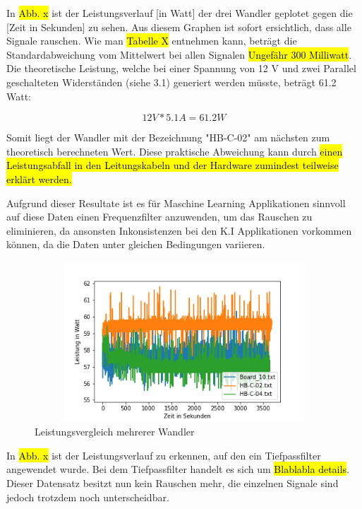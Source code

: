 \begin{flushleft}

In \hl{Abb. x} ist der Leistungsverlauf [in Watt] der drei Wandler geplotet gegen die [Zeit in Sekunden] zu sehen. Aus diesem Graphen ist sofort ersichtlich, dass alle Signale rauschen. Wie man \hl{Tabelle X} entnehmen kann, beträgt die Standardabweichung vom Mittelwert bei allen Signalen \hl{Ungefähr 300 Milliwatt}. Die theoretische Leistung, welche bei einer Spannung von 12 V und zwei Parallel geschalteten Widerständen (siehe 3.1) generiert werden müsste, beträgt 61.2 Watt: 

\begin{equation}[H]
\label{Ohmsches Gesetz}
12 V * 5.1 A = 61.2 W 
\end{equation} 

Somit liegt der Wandler mit der Bezeichnung "HB-C-02" am nächsten zum theoretisch berechneten Wert. Diese praktische Abweichung kann durch \hl{einen Leistungsabfall in den Leitungskabeln und der Hardware zumindest teilweise erklärt werden.}

Aufgrund dieser Resultate ist es für Maschine Learning Applikationen sinnvoll auf diese Daten einen Frequenzfilter anzuwenden, um das Rauschen zu eliminieren, da ansonsten Inkonsistenzen bei den K.I Applikationen vorkommen können, da die Daten unter gleichen Bedingungen variieren. 

\end{flushleft}

\begin{figure}[H]
    \centering
    \includegraphics[height= 6cm, width = 12cm]{Pictures/3_Boards_Leistung.png}
    \caption{Leistungsvergleich mehrerer Wandler}
\end{figure}



In \hl{Abb. x} ist der Leistungsverlauf zu erkennen, auf den ein Tiefpassfilter angewendet wurde. Bei dem Tiefpassfilter handelt es sich um \hl{Blablabla details}. Dieser Datensatz besitzt nun kein Rauschen mehr, die einzelnen Signale sind jedoch trotzdem noch unterscheidbar. 


